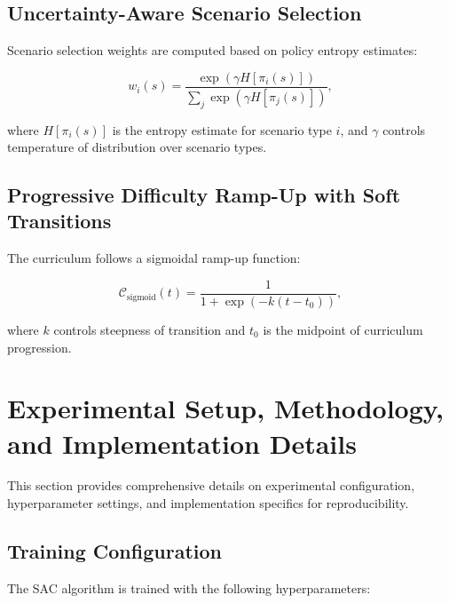 \documentclass[10pt,twocolumn,letterpaper]{article}
\begin{document}
\subsection{Uncertainty-Aware Scenario Selection}

Scenario selection weights are computed based on policy entropy estimates:

\begin{equation}
    w_i(s) = \frac{\exp(\gamma H[\pi_i(s)])}{\sum_j \exp(\gamma H[\pi_j(s)])},
    \label{eq:uncertainty_weights}
\end{equation}

where $H[\pi_i(s)]$ is the entropy estimate for scenario type $i$, and $\gamma$ controls temperature of distribution over scenario types.

\subsection{Progressive Difficulty Ramp-Up with Soft Transitions}

The curriculum follows a sigmoidal ramp-up function:

\begin{equation}
    \mathcal{C}_\text{sigmoid}(t) = \frac{1}{1+\exp(-k(t-t_0))},
    \label{eq:curriculum_sigmoid}
\end{equation}

where $k$ controls steepness of transition and $t_0$ is the midpoint of curriculum progression.

\section{Experimental Setup, Methodology, and Implementation Details}

This section provides comprehensive details on experimental configuration, hyperparameter settings, and implementation specifics for reproducibility.

\subsection{Training Configuration}

The SAC algorithm is trained with the following hyperparameters:
\end{document}
